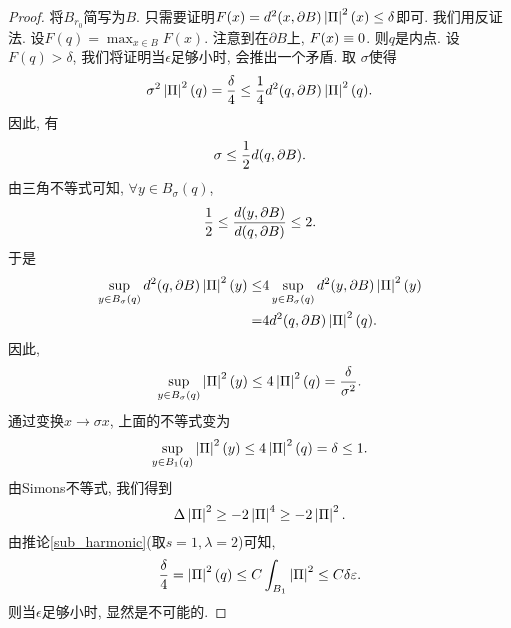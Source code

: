 \begin{proof}
    将$B_{r_0}$简写为$B$. 只需要证明$F(x)=d^2(x,\P B)\abs{\II}^2(x) \le \delta$即可. 我们用反证法. 设$F(q)=\max_{x \in B}F(x)$. 注意到在$\partial B$上, $F(x) \eq 0$. 则$q$是内点.  设$F(q) > \delta$, 我们将证明当$\epsilon$足够小时, 会推出一个矛盾. 取 $\sigma$使得
    \begin{equation}
        \sigma^2\abs{\II}^2(q)=\frac{\delta}{4} \le \frac{1}{4} d^2(q,\P B)\abs{\II}^2(q).
    \end{equation}
    因此, 有
    \begin{equation}
        \sigma \le \frac{1}{2}d(q,\P B).
    \end{equation}
    由三角不等式可知,  $\forall y \in B_\sigma(q)$,
    \begin{equation}
        \frac{1}{2} \le \frac{d(y,\P B)}{d(q,\P B)} \le 2.
    \end{equation}
    于是
    \begin{equation}
        \begin{split}
            \sup_{y\in B_\sigma(q)} d^2(q,\P B) \abs{\II}^2(y) \le &4\sup_{y\in B_\sigma(q)}d^2(y,\P B)\abs{\II}^2(y) \\
            =& 4d^2(q,\P B) \abs{\II}^2(q).
        \end{split}
    \end{equation}
    因此,
    \begin{equation}
        \sup_{y \in B_\sigma(q)} \abs{\II}^2(y) \le 4\abs{\II}^2(q)=\frac{\delta}{\sigma^2}.
    \end{equation}
    通过变换$x\to \sigma x$, 上面的不等式变为
    \begin{equation} \label{ii_sup}
        \sup_{y \in B_1(q)} \abs{\II}^2(y) \le 4\abs{\II}^2(q)=\delta \le 1.
    \end{equation}
    由Simons不等式, 我们得到
    \begin{equation}
        \Delta \abs{\II}^2 \ge -2\abs{\II}^4 \ge -2 \abs{\II}^2.
    \end{equation}
    由推论\eqref{sub_harmonic}(取$s=1,\lambda=2$)可知,
    \begin{equation}
        \frac{\delta}{4}=\abs{\II}^2(q) \le C \int_{B_1} \abs{\II}^2 \le C\delta\epsilon.
    \end{equation}
    则当$\epsilon$足够小时, 显然是不可能的.
\end{proof}
